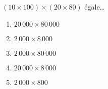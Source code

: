$(10\times100)\times(20\times80)$ égale\ldots
\begin{multicols}{5}
  \begin{enumerate}[A/]
  \item $20\,000\times80\,000$
  \item $2\,000\times8\,000$
  \item $2\,000\times80\,000$
  \item $20\,000\times8\,000$
  \item $2\,000\times800$
  \end{enumerate}
\end{multicols}
